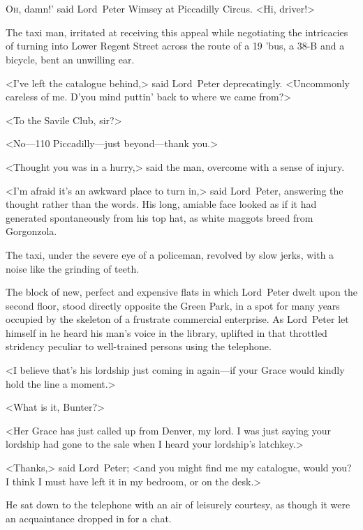 \chapter[Chapter \thechapter]{}
\lettrine[lines=4,ante=‘]{O}{h}, damn!' said Lord~Peter Wimsey at Piccadilly Circus. <Hi, driver!>

\zz
The taxi man, irritated at receiving this appeal while negotiating the intricacies of turning into Lower Regent Street across the route of a 19 'bus, a 38-B and a bicycle, bent an unwilling ear.

<I've left the catalogue behind,> said Lord~Peter deprecatingly. <Uncommonly careless of me. D'you mind puttin' back to where we came from?>

<To the Savile Club, sir?>

<No—110 Piccadilly—just beyond—thank you.>

<Thought you was in a hurry,> said the man, overcome with a sense of injury.

<I'm afraid it's an awkward place to turn in,> said Lord~Peter, answering the thought rather than the words. His long, amiable face looked as if it had generated spontaneously from his top hat, as white maggots breed from Gorgonzola.

The taxi, under the severe eye of a policeman, revolved by slow jerks, with a noise like the grinding of teeth.

The block of new, perfect and expensive flats in which Lord~Peter dwelt upon the second floor, stood directly opposite the Green Park, in a spot for many years occupied by the skeleton of a frustrate commercial enterprise. As Lord~Peter let himself in he heard his man's voice in the library, uplifted in that throttled stridency peculiar to well-trained persons using the telephone.

<I believe that's his lordship just coming in again—if your Grace would kindly hold the line a moment.>

<What is it, Bunter?>

<Her Grace has just called up from Denver, my lord. I was just saying your lordship had gone to the sale when I heard your lordship's latchkey.>

<Thanks,> said Lord~Peter; <and you might find me my catalogue, would you? I think I must have left it in my bedroom, or on the desk.>

He sat down to the telephone with an air of leisurely courtesy, as though it were an acquaintance dropped in for a chat.

